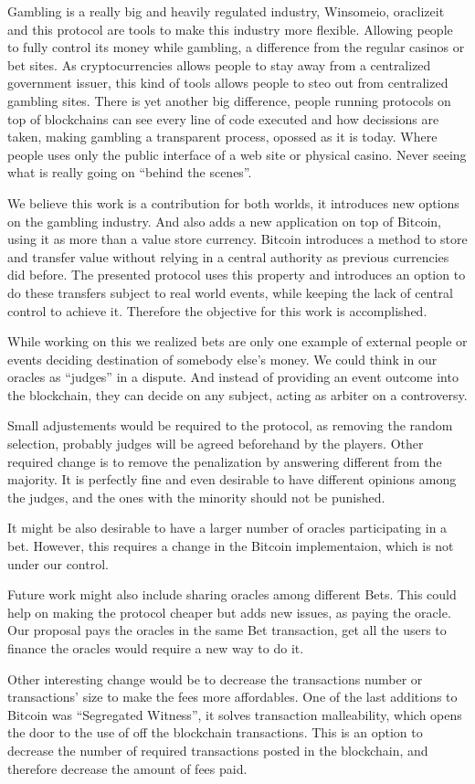 Gambling is a really big and heavily regulated industry, Winsomeio, oraclizeit
  and this protocol are tools to make this industry more flexible.
Allowing people to fully control its money while gambling, a difference from
  the regular casinos or bet sites.
As cryptocurrencies allows people to stay away from a centralized government
  issuer, this kind of tools allows people to steo out from centralized gambling
  sites.
There is yet another big difference, people running protocols on top of
  blockchains can see every line of code executed and how decissions are taken,
  making gambling a transparent process, opossed as it is today.
Where people uses only the public interface of a web site or physical casino.
Never seeing what is really going on ``behind the scenes''.

We believe this work is a contribution for both worlds, it introduces new
  options on the gambling industry.
And also adds a new application on top of Bitcoin, using it as more than a
  value store currency.
Bitcoin introduces a method to store and transfer value without relying in a
  central authority as previous currencies did before.
The presented protocol uses this property and introduces an option to do
  these transfers subject to real world events, while keeping the lack
  of central control to achieve it.
Therefore the objective for this work is accomplished.

While working on this we realized bets are only one example of external
  people or events deciding destination of somebody else's money.
We could think in our oracles as ``judges'' in a dispute.
And instead of providing an event outcome into the blockchain, they can
  decide on any subject, acting as arbiter on a controversy.

Small adjustements would be required to the protocol, as removing the random
  selection, probably judges will be agreed beforehand by the players.
Other required change is to remove the penalization by answering different
  from the majority.
It is perfectly fine and even desirable to have different opinions among the
  judges, and the ones with the minority should not be punished.

It might be also desirable to have a larger number of oracles participating in
  a bet.
However, this requires a change in the Bitcoin implementaion, which is not
  under our control.

Future work might also include sharing oracles among different Bets.
This could help on making the protocol cheaper but adds new issues, as paying
  the oracle.
Our proposal pays the oracles in the same Bet transaction, get all the users to
  finance the oracles would require a new way to do it.

Other interesting change would be to decrease the transactions number or
  transactions' size to make the fees more affordables.
One of the last additions to Bitcoin was ``Segregated Witness'', it solves
  transaction malleability, which opens the door to the use of off the blockchain
  transactions.
This is an option to decrease the number of required transactions posted in the
  blockchain, and therefore decrease the amount of fees paid.

